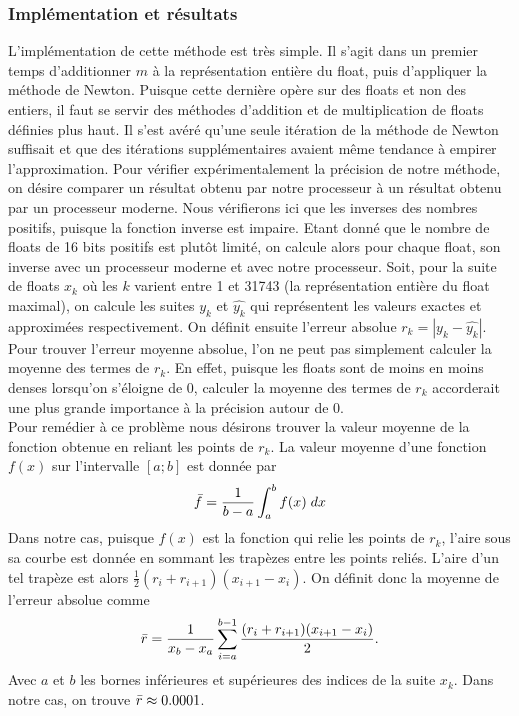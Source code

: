 \documentclass{article}
\begin{document}
\subsubsection{Implémentation et résultats}
L’implémentation de cette méthode est très simple. Il s'agit dans un premier temps d'additionner $m$ à la représentation entière du float, puis d'appliquer la méthode de Newton. Puisque cette dernière opère sur des floats et non des entiers, il faut se servir des méthodes d'addition et de multiplication de floats définies plus haut. Il s'est avéré qu'une seule itération de la méthode de Newton suffisait et que des itérations supplémentaires avaient même tendance à empirer l'approximation.
Pour vérifier expérimentalement la précision de notre méthode, on désire comparer un résultat obtenu par notre processeur à un résultat obtenu par un processeur moderne. Nous vérifierons ici que les inverses des nombres positifs, puisque la fonction inverse est impaire. Etant donné que le nombre de floats de 16 bits positifs est plutôt limité, on calcule alors pour chaque float, son inverse avec un processeur moderne et avec notre processeur. Soit, pour la suite de floats $x_k$ où les $k$ varient entre 1 et 31743 (la représentation entière du float maximal), on calcule les suites $y_k$ et $\hat{y_k}$ qui représentent les valeurs exactes et approximées respectivement. On définit ensuite l'erreur absolue $r_k = |y_k-\hat{y_k}|$. Pour trouver l'erreur moyenne absolue, l'on ne peut pas simplement calculer la moyenne des termes de $r_k$. En effet, puisque les floats sont de moins en moins denses lorsqu'on s'éloigne de 0, calculer la moyenne des termes de $r_k$ accorderait une plus grande importance à la précision autour de 0.\\
Pour remédier à ce problème nous désirons trouver la valeur moyenne de la fonction obtenue en reliant les points de $r_k$. La valeur moyenne d'une fonction $f(x)$ sur l'intervalle $[a;b]$ est donnée par
$$
\Bar{f} = \frac{1}{b-a}\int_a^bf(x)\;dx
$$
Dans notre cas, puisque $f(x)$ est la fonction qui relie les points de $r_k$, l'aire sous sa courbe est donnée en sommant les trapèzes entre les points reliés. L'aire d'un tel trapèze est alors $\frac12(r_i+r_{i+1})(x_{i+1}-x_i)$.
On définit donc la moyenne de l'erreur absolue comme
$$
\Bar{r} = \frac{1}{x_b-x_a}\sum_{i=a}^{b-1}\frac{(r_i+r_{i+1})(x_{i+1}-x_i)}2.
$$
Avec $a$ et $b$ les bornes inférieures et supérieures des indices de la suite $x_k$. Dans notre cas, on trouve $\Bar{r} \approx 0.0001$.
\end{document}
